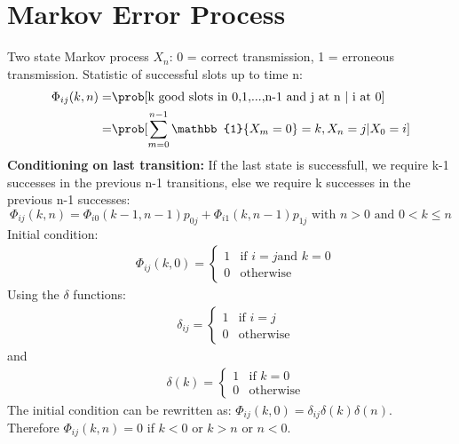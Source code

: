 \chapter{Markov Error Process}
Two state Markov process $X_n$: 0 = correct transmission, 1 = erroneous transmission. Statistic of successful slots up to time n:
\begin{equation}
	\begin{split}
			\Phi_{ij}(k,n) = & \prob[\textrm{k good slots in 0,1,...,n-1 and j at n | i at 0}] \\
										 = & \prob[\sum\limits_{m=0}^{n-1} \mathbb{1}\{X_m = 0\} = k, X_n = j | X_0 = i]
	\end{split}
\end{equation}
\textbf{Conditioning on last transition:}
If the last state is successfull, we require k-1 successes in the previous n-1 transitions, else we require k successes in the previous n-1 successes:
$$\Phi_{ij}(k,n) = \Phi_{i0}(k-1,n-1)p_{0j} + \Phi_{i1}(k,n-1)p_{1j} \textrm{ with } n>0 \textrm{ and } 0<k\leq n$$
Initial condition:
\begin{equation}
 \begin{split}
	 &\Phi_{ij}(k,0)=
	 \begin{cases}
		 1 &  \text{if } i = j \text{and } k = 0 \\
		 0 &  \text{otherwise}
	 \end{cases}
 \end{split}
\end{equation}
Using the $\delta$ functions:
\begin{equation*}
 \begin{split}
	 &\delta_{ij}=
	 \begin{cases}
		 1 &  \text{if } i = j \\
		 0 &  \text{otherwise}
	 \end{cases}
 \end{split}
\end{equation*}
and
\begin{equation*}
 \begin{split}
	 &\delta(k)=
	 \begin{cases}
		 1 &  \text{if } k = 0 \\
		 0 &  \text{otherwise}
	 \end{cases}
 \end{split}
\end{equation*}
The initial condition can be rewritten as: $\Phi_{ij}(k,0)=\delta_{ij}\delta(k)\delta(n)$.\\
Therefore $\Phi_{ij}(k,n) = 0$ if $k<0$ or $k>n$ or $n<0$.\\

